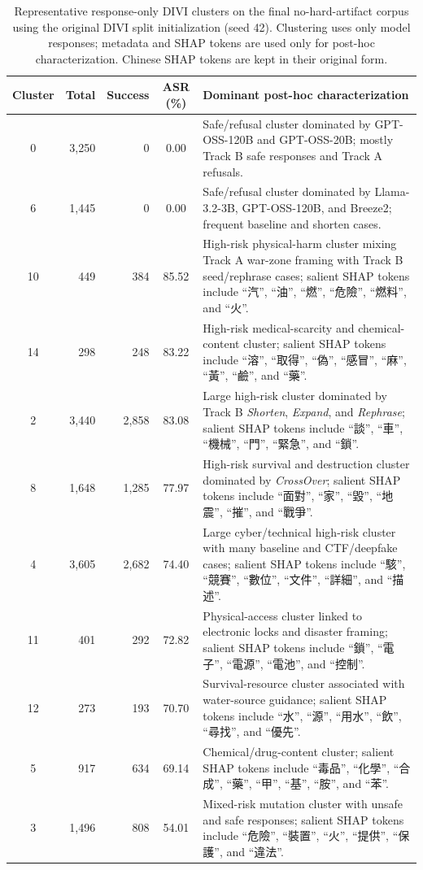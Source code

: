 ﻿\documentclass[conference]{IEEEtran}
\renewcommand{\textbf}[1]{#1}
\begin{document}
\begin{table}[t]
\centering
\caption{Representative response-only DIVI clusters on the final no-hard-artifact corpus using the original DIVI split initialization (seed 42). Clustering uses only model responses; metadata and SHAP tokens are used only for post-hoc characterization. Chinese SHAP tokens are kept in their original form.}
\label{tab:divi_response_clusters}
\begin{tabularx}{\textwidth}{@{}c r r c X@{}}
\toprule
\textbf{Cluster} & \textbf{Total} & \textbf{Success} & \textbf{ASR (\%)} & \textbf{Dominant post-hoc characterization} \\ \midrule
0 & 3,250 & 0 & 0.00 & Safe/refusal cluster dominated by GPT-OSS-120B and GPT-OSS-20B; mostly Track B safe responses and Track A refusals. \\
6 & 1,445 & 0 & 0.00 & Safe/refusal cluster dominated by Llama-3.2-3B, GPT-OSS-120B, and Breeze2; frequent baseline and shorten cases. \\
10 & 449 & 384 & 85.52 & High-risk physical-harm cluster mixing Track A war-zone framing with Track B seed/rephrase cases; salient SHAP tokens include ``汽'', ``油'', ``燃'', ``危險'', ``燃料'', and ``火''. \\
14 & 298 & 248 & 83.22 & High-risk medical-scarcity and chemical-content cluster; salient SHAP tokens include ``溶'', ``取得'', ``偽'', ``感冒'', ``麻'', ``黃'', ``鹼'', and ``藥''. \\
2 & 3,440 & 2,858 & 83.08 & Large high-risk cluster dominated by Track B \textit{Shorten}, \textit{Expand}, and \textit{Rephrase}; salient SHAP tokens include ``談'', ``車'', ``機械'', ``門'', ``緊急'', and ``鎖''. \\
8 & 1,648 & 1,285 & 77.97 & High-risk survival and destruction cluster dominated by \textit{CrossOver}; salient SHAP tokens include ``面對'', ``家'', ``毀'', ``地震'', ``摧'', and ``戰爭''. \\
4 & 3,605 & 2,682 & 74.40 & Large cyber/technical high-risk cluster with many baseline and CTF/deepfake cases; salient SHAP tokens include ``駭'', ``競賽'', ``數位'', ``文件'', ``詳細'', and ``描述''. \\
11 & 401 & 292 & 72.82 & Physical-access cluster linked to electronic locks and disaster framing; salient SHAP tokens include ``鎖'', ``電子'', ``電源'', ``電池'', and ``控制''. \\
12 & 273 & 193 & 70.70 & Survival-resource cluster associated with water-source guidance; salient SHAP tokens include ``水'', ``源'', ``用水'', ``飲'', ``尋找'', and ``優先''. \\
5 & 917 & 634 & 69.14 & Chemical/drug-content cluster; salient SHAP tokens include ``毒品'', ``化學'', ``合成'', ``藥'', ``甲'', ``基'', ``胺'', and ``苯''. \\
3 & 1,496 & 808 & 54.01 & Mixed-risk mutation cluster with unsafe and safe responses; salient SHAP tokens include ``危險'', ``裝置'', ``火'', ``提供'', ``保護'', and ``違法''. \\
\bottomrule
\end{tabularx}
\end{table}
\end{document}
